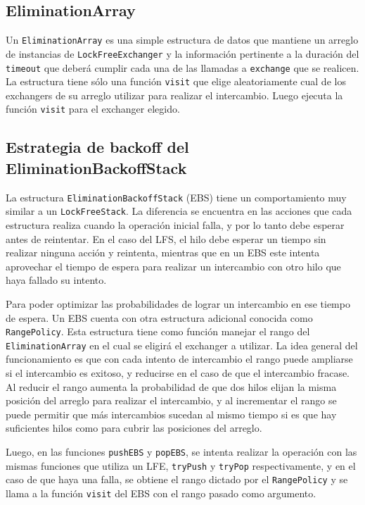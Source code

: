 \subsection{EliminationArray}
Un \texttt{EliminationArray} es una simple estructura de datos que mantiene un arreglo de instancias de \texttt{LockFreeExchanger} y la información pertinente a la duración del \texttt{timeout} que deberá cumplir cada una de las llamadas a \texttt{exchange} que se realicen.
La estructura tiene sólo una función \texttt{visit} que elige aleatoriamente cual de los exchangers de su arreglo utilizar para realizar el intercambio. Luego ejecuta la función \texttt{visit} para el exchanger elegido.

\subsection{Estrategia de backoff del EliminationBackoffStack}
La estructura \texttt{EliminationBackoffStack} (EBS) tiene un comportamiento muy similar a un \texttt{LockFreeStack}. La diferencia se encuentra en las acciones que cada estructura realiza cuando la operación inicial falla, y por lo tanto debe esperar antes de reintentar. En el caso del LFS, el hilo debe esperar un tiempo sin realizar ninguna acción y reintenta, mientras que en un EBS este intenta aprovechar el tiempo de espera para realizar un intercambio con otro hilo que haya fallado su intento.

Para poder optimizar las probabilidades de lograr un intercambio en ese tiempo de espera. Un EBS cuenta con otra estructura adicional conocida como \texttt{RangePolicy}. Esta estructura tiene como función manejar el rango del \texttt{EliminationArray} en el cual se eligirá el exchanger a utilizar.
La idea general del funcionamiento es que con cada intento de intercambio el rango puede ampliarse si el intercambio es exitoso, y reducirse en el caso de que el intercambio fracase.
Al reducir el rango aumenta la probabilidad de que dos hilos elijan la misma posición del arreglo para realizar el intercambio, y al incrementar el rango se puede permitir que más intercambios sucedan al mismo tiempo si es que hay suficientes hilos como para cubrir las posiciones del arreglo.

Luego, en las funciones \texttt{pushEBS} y \texttt{popEBS}, se intenta realizar la operación con las mismas funciones que utiliza un LFE, \texttt{tryPush} y \texttt{tryPop} respectivamente, y en el caso de que haya una falla, se obtiene el rango dictado por el \texttt{RangePolicy} y se llama a la función \texttt{visit} del EBS con el rango pasado como argumento.

